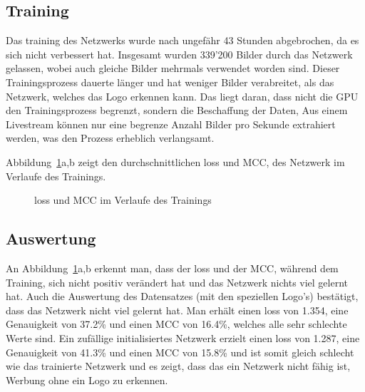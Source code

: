 \documentclass[12pt,a4paper]{report}
\begin{document}
\subsection{Training}
Das training des Netzwerks wurde nach ungefähr 43 Stunden abgebrochen, da es sich nicht verbessert hat.
Insgesamt wurden 339'200 Bilder durch das Netzwerk gelassen, wobei auch gleiche Bilder mehrmals verwendet worden sind.
Dieser Trainingsprozess dauerte länger und hat weniger Bilder verabreitet, als das Netzwerk, welches das Logo erkennen kann.
Das liegt daran, dass nicht die GPU den Trainingsprozess begrenzt, sondern die Beschaffung der Daten,
Aus einem Livestream können nur eine begrenze Anzahl Bilder pro Sekunde extrahiert werden, was den Prozess erheblich verlangsamt.

Abbildung~\ref{fig:loss2}a,b zeigt den durchschnittlichen loss und MCC,
des Netzwerk im Verlaufe des Trainings.
\begin{figure}[h]%
    \centering
    \qquad
    \caption{loss und MCC im Verlaufe des Trainings}%
    \label{fig:loss2}%
\end{figure}
\subsection{Auswertung}
An Abbildung~\ref{fig:loss2}a,b erkennt man,
dass der loss und der MCC, während dem Training, sich nicht positiv verändert hat und das Netzwerk nichts viel gelernt hat.
Auch die Auswertung des Datensatzes (mit den speziellen Logo's) bestätigt, dass das Netzwerk nicht viel gelernt hat.
Man erhält einen loss von 1.354, eine Genauigkeit von 37.2\% und einen MCC von 16.4\%, welches alle sehr schlechte Werte sind.
Ein zufällige initialisiertes Netzwerk erzielt einen loss von 1.287, eine Genauigkeit von 41.3\% und einen MCC von 15.8\% und
ist somit gleich schlecht wie das trainierte Netzwerk und es zeigt,
dass das ein Netzwerk nicht fähig ist, Werbung ohne ein Logo zu erkennen.
\end{document}
